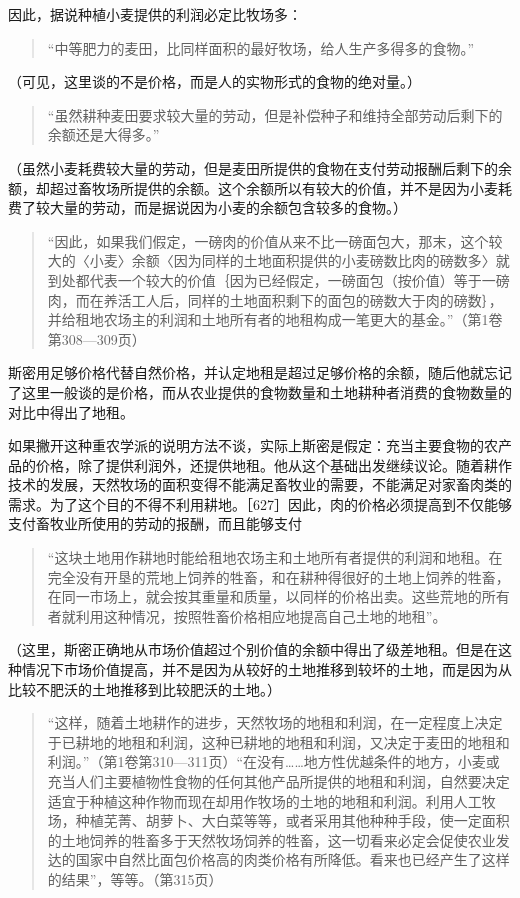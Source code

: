 因此，据说种植小麦提供的利润必定比牧场多：

\begin{quote}{“中等肥力的麦田，比同样面积的最好牧场，给人生产多得多的食物。”}\end{quote}

（可见，这里谈的不是价格，而是人的实物形式的食物的绝对量。）

\begin{quote}{“虽然耕种麦田要求较大量的劳动，但是补偿种子和维持全部劳动后剩下的余额还是大得多。”}\end{quote}

（虽然小麦耗费较大量的劳动，但是麦田所提供的食物在支付劳动报酬后剩下的余额，却超过畜牧场所提供的余额。这个余额所以有较大的价值，并不是因为小麦耗费了较大量的劳动，而是据说因为小麦的余额包含较多的食物。）

\begin{quote}{“因此，如果我们假定，一磅肉的价值从来不比一磅面包大，那末，这个较大的〈小麦〉余额〈因为同样的土地面积提供的小麦磅数比肉的磅数多〉就到处都代表一个较大的价值｛因为已经假定，一磅面包（按价值）等于一磅肉，而在养活工人后，同样的土地面积剩下的面包的磅数大于肉的磅数｝，并给租地农场主的利润和土地所有者的地租构成一笔更大的基金。”（第1卷第308—309页）}\end{quote}

斯密用足够价格代替自然价格，并认定地租是超过足够价格的余额，随后他就忘记了这里一般谈的是价格，而从农业提供的食物数量和土地耕种者消费的食物数量的对比中得出了地租。

如果撇开这种重农学派的说明方法不谈，实际上斯密是假定：充当主要食物的农产品的价格，除了提供利润外，还提供地租。他从这个基础出发继续议论。随着耕作技术的发展，天然牧场的面积变得不能满足畜牧业的需要，不能满足对家畜肉类的需求。为了这个目的不得不利用耕地。［627］因此，肉的价格必须提高到不仅能够支付畜牧业所使用的劳动的报酬，而且能够支付

\begin{quote}{“这块土地用作耕地时能给租地农场主和土地所有者提供的利润和地租。在完全没有开垦的荒地上饲养的牲畜，和在耕种得很好的土地上饲养的牲畜，在同一市场上，就会按其重量和质量，以同样的价格出卖。这些荒地的所有者就利用这种情况，按照牲畜价格相应地提高自己土地的地租”。}\end{quote}

（这里，斯密正确地从市场价值超过个别价值的余额中得出了级差地租。但是在这种情况下市场价值提高，并不是因为从较好的土地推移到较坏的土地，而是因为从比较不肥沃的土地推移到比较肥沃的土地。）

\begin{quote}{“这样，随着土地耕作的进步，天然牧场的地租和利润，在一定程度上决定于已耕地的地租和利润，这种已耕地的地租和利润，又决定于麦田的地租和利润。”（第1卷第310—311页）“在没有……地方性优越条件的地方，小麦或充当人们主要植物性食物的任何其他产品所提供的地租和利润，自然要决定适宜于种植这种作物而现在却用作牧场的土地的地租和利润。利用人工牧场，种植芜菁、胡萝卜、大白菜等等，或者采用其他种种手段，使一定面积的土地饲养的牲畜多于天然牧场饲养的牲畜，这一切看来必定会促使农业发达的国家中自然比面包价格高的肉类价格有所降低。看来也已经产生了这样的结果”，等等。（第315页）}\end{quote}

